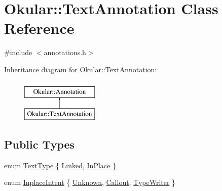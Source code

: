 \hypertarget{classOkular_1_1TextAnnotation}{\section{Okular\+:\+:Text\+Annotation Class Reference}
\label{classOkular_1_1TextAnnotation}
}


{\ttfamily \#include $<$annotations.\+h$>$}

Inheritance diagram for Okular\+:\+:Text\+Annotation\+:\begin{figure}[H]
\begin{center}
\leavevmode
\includegraphics[height=2.000000cm]{classOkular_1_1TextAnnotation}
\end{center}
\end{figure}
\subsection*{Public Types}
\begin{DoxyCompactItemize}
\item 
enum \hyperlink{classOkular_1_1TextAnnotation_af560204454bf812797bc95bea730b06e}{Text\+Type} \{ \hyperlink{classOkular_1_1TextAnnotation_af560204454bf812797bc95bea730b06eaf7d7133e8e4850bf030e108537a9887b}{Linked}, 
\hyperlink{classOkular_1_1TextAnnotation_af560204454bf812797bc95bea730b06ea2a746e9125e8cf53627335a8af01b998}{In\+Place}
 \}
\item 
enum \hyperlink{classOkular_1_1TextAnnotation_a6494ecc81861c6b3da81aa98a3cd16c5}{Inplace\+Intent} \{ \hyperlink{classOkular_1_1TextAnnotation_a6494ecc81861c6b3da81aa98a3cd16c5a6562381985b3edbd68dab5602bed50f6}{Unknown}, 
\hyperlink{classOkular_1_1TextAnnotation_a6494ecc81861c6b3da81aa98a3cd16c5a1fb0eb4296023907cede7a44c71f8ba3}{Callout}, 
\hyperlink{classOkular_1_1TextAnnotation_a6494ecc81861c6b3da81aa98a3cd16c5adcb9a736c4560aed07977823b8e79e38}{Type\+Writer}
 \}
\end{DoxyCompactItemize}

